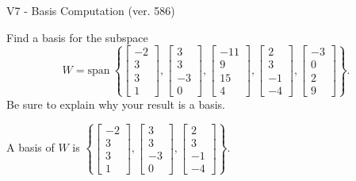 \begin{exercise}
  \begin{exerciseTitle}V7 - Basis Computation (ver. 586)\end{exerciseTitle}
  \begin{exerciseStatement}
    Find a basis for the subspace 
\[W=\mathrm{span}\ \left\{\left[\begin{array}{r}
-2 \\
3 \\
3 \\
1
\end{array}\right] , \left[\begin{array}{r}
3 \\
3 \\
-3 \\
0
\end{array}\right] , \left[\begin{array}{r}
-11 \\
9 \\
15 \\
4
\end{array}\right] , \left[\begin{array}{r}
2 \\
3 \\
-1 \\
-4
\end{array}\right] , \left[\begin{array}{r}
-3 \\
0 \\
2 \\
9
\end{array}\right]\right\}.\]
 Be sure to explain why your result is a basis.


  \end{exerciseStatement}
  \begin{exerciseAnswer}
   A basis of \(W\) is  \(\left\{\left[\begin{array}{r}
-2 \\
3 \\
3 \\
1
\end{array}\right] , \left[\begin{array}{r}
3 \\
3 \\
-3 \\
0
\end{array}\right] , \left[\begin{array}{r}
2 \\
3 \\
-1 \\
-4
\end{array}\right]\right\}\).
  


  \end{exerciseAnswer}
\end{exercise}